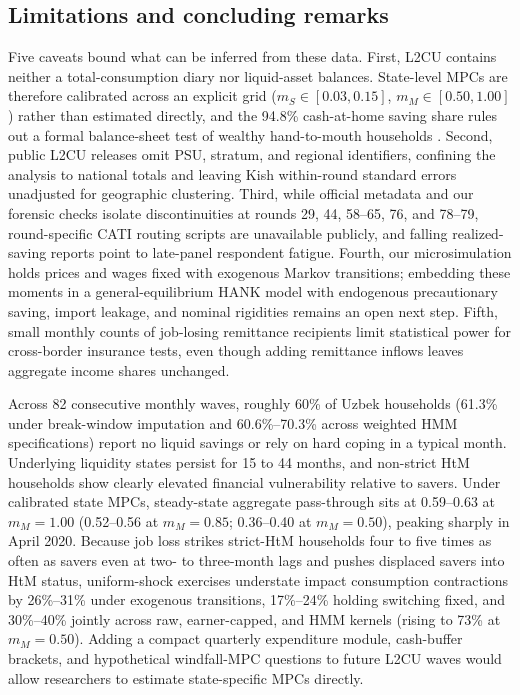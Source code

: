 \documentclass[11pt]{article}
\begin{document}
\subsection{Limitations and concluding remarks}\label{sec:concl}

Five caveats bound what can be inferred from these data. First, L2CU contains neither a total-consumption diary nor liquid-asset balances. State-level MPCs are therefore calibrated across an explicit grid ($m_S \in [0.03, 0.15]$, $m_M \in [0.50, 1.00]$) rather than estimated directly, and the 94.8\% cash-at-home saving share rules out a formal balance-sheet test of wealthy hand-to-mouth households \citep{kaplan2014wealthy}. Second, public L2CU releases omit PSU, stratum, and regional identifiers, confining the analysis to national totals and leaving Kish within-round standard errors unadjusted for geographic clustering. Third, while official metadata and our forensic checks isolate discontinuities at rounds 29, 44, 58--65, 76, and 78--79, round-specific CATI routing scripts are unavailable publicly, and falling realized-saving reports point to late-panel respondent fatigue. Fourth, our microsimulation holds prices and wages fixed with exogenous Markov transitions; embedding these moments in a general-equilibrium HANK model with endogenous precautionary saving, import leakage, and nominal rigidities remains an open next step. Fifth, small monthly counts of job-losing remittance recipients limit statistical power for cross-border insurance tests, even though adding remittance inflows leaves aggregate income shares unchanged.

Across 82 consecutive monthly waves, roughly 60\% of Uzbek households (61.3\% under break-window imputation and 60.6\%--70.3\% across weighted HMM specifications) report no liquid savings or rely on hard coping in a typical month. Underlying liquidity states persist for 15 to 44 months, and non-strict HtM households show clearly elevated financial vulnerability relative to savers. Under calibrated state MPCs, steady-state aggregate pass-through sits at 0.59--0.63 at $m_M = 1.00$ (0.52--0.56 at $m_M = 0.85$; 0.36--0.40 at $m_M = 0.50$), peaking sharply in April 2020. Because job loss strikes strict-HtM households four to five times as often as savers even at two- to three-month lags and pushes displaced savers into HtM status, uniform-shock exercises understate impact consumption contractions by 26\%--31\% under exogenous transitions, 17\%--24\% holding switching fixed, and 30\%--40\% jointly across raw, earner-capped, and HMM kernels (rising to 73\% at $m_M = 0.50$). Adding a compact quarterly expenditure module, cash-buffer brackets, and hypothetical windfall-MPC questions \citep{jappelli2014fiscal,fuster2021what} to future L2CU waves would allow researchers to estimate state-specific MPCs directly.
\end{document}
